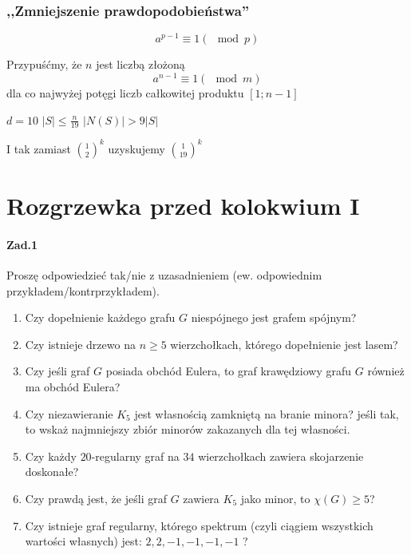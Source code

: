 \subsubsection{,,Zmniejszenie prawdopodobieństwa''}
\begin{theorem}
$$a^{p-1}\equiv 1 (\mod p)$$
\end{theorem}
Przypuśćmy, że $n$ jest liczbą złożoną
$$a^{n-1}\equiv 1(\mod m)$$
dla co najwyżej potęgi liczb całkowitej produktu $[1;n-1]$
\begin{figure}[H]
\centering 
{}
\end{figure}
$d=10$ $|S|\leq \frac{n}{19}$ $|N(S)|> 9|S|$

I tak zamiast $\binom{1}{2}^k$ uzyskujemy $\binom{1}{19}^k$ 


\section{Rozgrzewka przed kolokwium I}
\paragraph{Zad.1}
Proszę odpowiedzieć tak/nie z uzasadnieniem (ew. odpowiednim przykładem/kontrprzykładem).
\begin{enumerate}[label=\alph*)]
\item Czy dopełnienie każdego grafu $G$ niespójnego jest grafem spójnym?
\item Czy istnieje drzewo na $n \geq 5$ wierzchołkach, którego dopełnienie jest lasem?
\item  Czy jeśli graf $G$ posiada obchód Eulera, to graf krawędziowy grafu $G$ również ma obchód Eulera?
\item Czy niezawieranie $K_5$ jest własnością zamkniętą na branie minora? jeśli tak, to wskaż najmniejszy zbiór minorów zakazanych dla tej własności.
\item  Czy każdy $20$-regularny graf na $34$ wierzchołkach zawiera skojarzenie doskonałe?
\item Czy prawdą jest, że jeśli graf $G$ zawiera $K_5$ jako minor, to $\chi(G) \geq 5$?
\item  Czy istnieje graf regularny, którego spektrum (czyli ciągiem wszystkich wartości własnych) jest: $2, 2, -1, -1, -1, -1$ ?
\end{enumerate}


